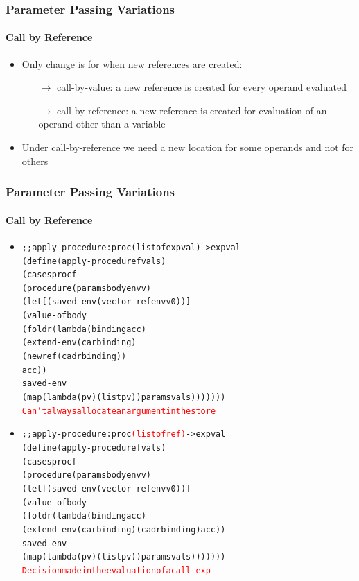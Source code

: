 \documentclass{beamer}
\newcommand{\arrow}{\(\rightarrow\)}
\begin{document}
\begin{frame}[fragile]
\frametitle{Parameter Passing Variations}
\framesubtitle{Call by Reference}
\begin{scriptsize}
\begin{itemize}
\item<1-> Only change is for when new references are created:
\begin{itemize}
 \item[\arrow] call-by-value: a new reference is created for every operand evaluated

 \item[\arrow] call-by-reference: a new reference is created for evaluation of an operand other than a variable
\end{itemize}

\item Under call-by-reference we need a new location for some operands and not for others

\end{itemize}
\end{scriptsize}
\end{frame}

\begin{frame}[fragile]
\frametitle{Parameter Passing Variations}
\framesubtitle{Call by Reference}
\begin{scriptsize}
\begin{itemize}
\item<1-> 
\begin{alltt}
;; apply-procedure : proc (listof expval) -> expval
(define (apply-procedure f vals)
  (cases proc f
    (procedure (params body envv)
      (let [(saved-env (vector-ref envv 0))]
        (value-of body
          (foldr (lambda (binding acc) 
                   (extend-env (car binding)
                               (newref (cadr binding))
                               acc))
                 saved-env
                 (map (lambda (p v) (list p v)) params vals)))))))
\textcolor{red}{Can't always allocate an argument in the store}
\end{alltt}

\item<2->
\begin{alltt}
;; apply-procedure : proc \textcolor{red}{(listof ref)} -> expval
(define (apply-procedure f vals)
 (cases proc f
  (procedure (params body envv)
   (let [(saved-env (vector-ref envv 0))]
    (value-of body
             (foldr (lambda (binding acc)
                     (extend-env (car binding) (cadr binding) acc))
                     saved-env
                     (map (lambda (p v) (list p v)) params vals)))))))
\textcolor{red}{Decision made in the evaluation of a call-exp}
\end{alltt}

\end{itemize}
\end{scriptsize}
\end{frame}
\end{document}
